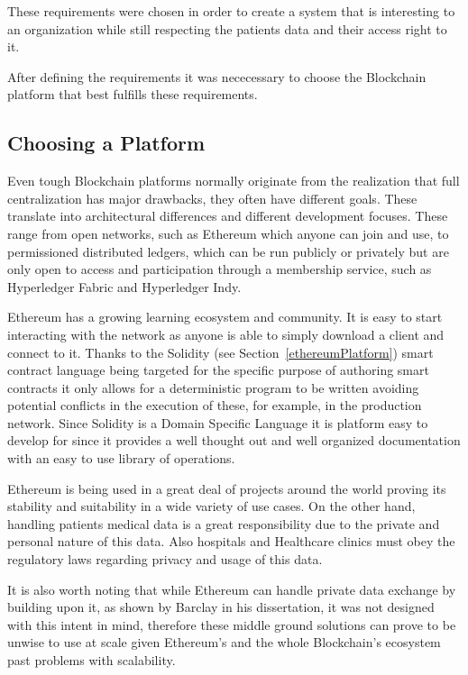 These requirements were chosen in order to create a system that is interesting
to an organization while still respecting the patients data and their access
right to it. 

After defining the requirements it was nececessary to choose the Blockchain
platform that best fulfills these requirements.

\subsection{Choosing a Platform}\label{choosePlatform}

Even tough Blockchain platforms normally originate from the realization that
full centralization has major drawbacks, they often have different goals. These
translate into architectural differences and different development focuses.
These range from open networks, such as Ethereum which anyone can join and use,
to permissioned distributed ledgers, which can be run publicly or privately but
are only open to access and participation through a membership service, such as
Hyperledger Fabric and Hyperledger Indy.

Ethereum has a growing learning ecosystem and community. It is easy to start
interacting with the network as anyone is able to simply download a client and
connect to it. Thanks to the Solidity (see Section~\ref{ethereumPlatform})
smart contract language being targeted for the specific purpose of authoring
smart contracts it only allows for a deterministic program to be written
avoiding potential conflicts in the execution of these, for example, in the
production network. Since Solidity is a Domain Specific Language it is platform
easy to develop for since it provides a well thought out and well organized
documentation with an easy to use library of operations.

Ethereum is being used in a great deal of projects around the world proving its
stability and suitability in a wide variety of use cases. On the other hand,
handling patients medical data is a great responsibility due to the private and
personal nature of this data. Also hospitals and Healthcare clinics must obey
the regulatory laws regarding privacy and usage of this data.

It is also worth noting that while Ethereum can handle private data exchange by
building upon it, as shown by Barclay in his dissertation, it was not designed
with this intent in mind, therefore these middle ground solutions can prove to
be unwise to use at scale given Ethereum's and the whole Blockchain's ecosystem
past problems with scalability.  

